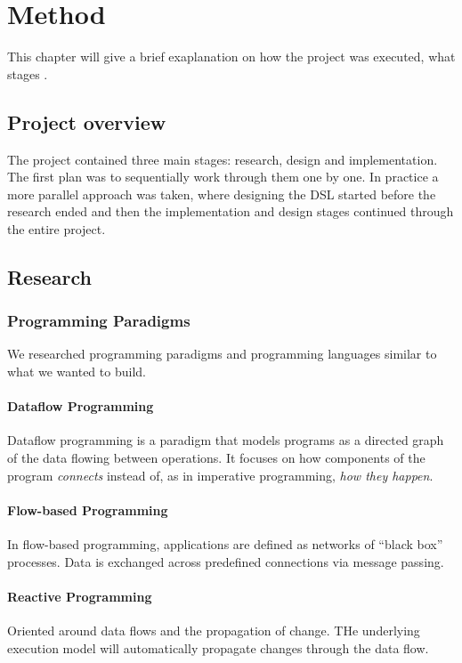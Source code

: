 \chapter{Method}
This chapter will give a brief exaplanation on how the project was
executed, what stages .


\section{Project overview}
The project contained three main stages: research, design and
implementation. The first plan was to sequentially work through them
one by one. In practice a more parallel approach was taken, where
designing the DSL started before the research ended and then the
implementation and design stages continued through the entire project.


\section{Research}

\subsection{Programming Paradigms}
We researched programming paradigms and programming languages similar
to what we wanted to build.

\subsubsection{Dataflow Programming}
Dataflow programming is a paradigm that models programs as a directed
graph of the data flowing between operations. It focuses on how
components of the program \emph{connects} instead of, as in imperative
programming, \emph{how they happen}. 

\subsubsection{Flow-based Programming}
In flow-based programming, applications are defined as networks of
``black box'' processes. Data is exchanged across predefined
connections via message passing. 

\subsubsection{Reactive Programming}
Oriented around data flows and the propagation of change. THe
underlying execution model will automatically propagate changes
through the data flow. 



